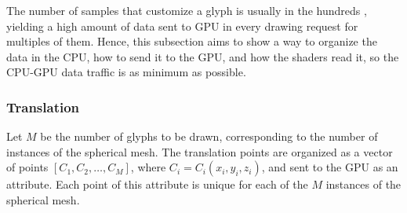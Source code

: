\documentclass[twoside,twocolumn,10pt]{article}
\begin{document}
The number of samples that customize a glyph is usually in the hundreds \cite{TuchQBall2004, yeh2010}, yielding a high amount of data sent to GPU in every drawing request for multiples of them. Hence, this subsection aims to show a way to organize the data in the CPU, how to send it to the GPU, and how the shaders read it, so the CPU-GPU data traffic is as minimum as possible. %






\subsubsection{Translation}
Let $M$ be the number of glyphs to be drawn, corresponding to the number of instances of the spherical mesh. The translation points are organized as a vector of points $[C_1,C_2, \dots, C_M]$, where $C_i= C_i(x_i, y_i, z_i)$, and sent to the GPU as an attribute. Each point of this attribute is unique for each of the $M$ instances of the spherical mesh.
\end{document}
